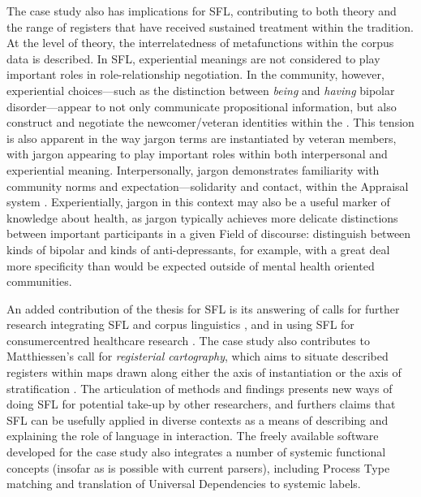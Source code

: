 The case study also has implications for \gls{SFL}, contributing to both theory and the range of registers that have received sustained treatment within the tradition. At the level of theory, the interrelatedness of metafunctions within the corpus data is described. In \gls{SFL}, experiential meanings are not considered to play important roles in role\hyp{}relationship negotiation. In the community, however, experiential choices---such as the distinction between \emph{being} and \emph{having} bipolar disorder---appear to not only communicate propositional information, but also construct and negotiate the newcomer\slash veteran identities within the . This tension is also apparent in the way jargon terms are instantiated by veteran members, with jargon appearing to play important roles within both interpersonal and experiential meaning. Interpersonally, jargon demonstrates familiarity with community norms and expectation---solidarity and contact, within the Appraisal system \cite{martin_language_2005}. Experientially, jargon in this context may also be a useful marker of knowledge about health, as jargon typically achieves more delicate distinctions between important participants in a given Field of discourse:   distinguish between kinds of \gls{bipolar} and kinds of anti\hyp{}depressants, for example, with a great deal more specificity than would be expected outside of mental health oriented communities. %

An added contribution of the thesis for \gls{SFL} is its answering of calls for further research integrating \gls{SFL} and corpus linguistics \cite{hunston_systemic_2013,thompson_system_2014}, and in using \gls{SFL} for \gls{consumercentred} healthcare research \cite{matthiessen_applying_2013,thompson2001interview}. The case study also contributes to Matthiessen's call for \emph{registerial cartography}, which aims to situate described registers within maps drawn along either the axis of instantiation or the axis of stratification \cite{matthiessen_modeling_2015}. The articulation of methods and findings presents new ways of doing \gls{SFL} for potential take\hyp{}up by other researchers, and furthers claims that \gls{SFL} can be usefully applied in diverse contexts as a means of describing and explaining the role of language in interaction. The freely available software developed for the case study also integrates a number of systemic functional concepts (insofar as is possible with current parsers), including Process Type matching and translation of Universal Dependencies \cite[see][]{nivre_towards_2015} to systemic labels.

